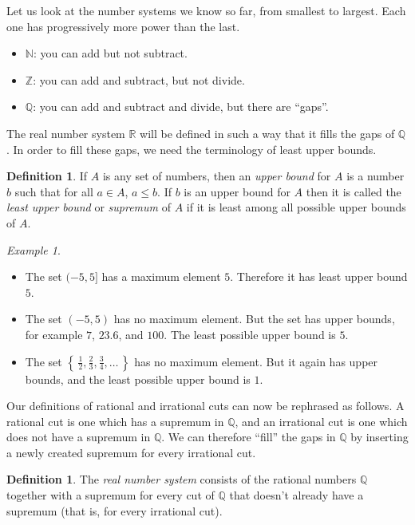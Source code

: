 \documentclass[11pt,oneside]{amsbook}
\newcommand{\set}[1]{\left\{\,#1\,\right\}}
\newcommand{\NN}{\mathbb N}
\newcommand{\ZZ}{\mathbb Z}
\newcommand{\QQ}{\mathbb Q}
\newcommand{\RR}{\mathbb R}
\theoremstyle{definition}
\theoremstyle{plain}
\theoremstyle{definition}
\newtheorem{defn}[thm]{Definition}
\theoremstyle{remark}
\newtheorem{example}[thm]{Example}
\numberwithin{equation}{section}
\numberwithin{figure}{section}
\begin{document}
Let us look at the number systems we know so far, from smallest to largest. Each one has progressively more power than the last.
\begin{itemize}
\item $\NN$: you can add but not subtract.
\item $\ZZ$: you can add and subtract, but not divide.
\item $\QQ$: you can add and subtract and divide, but there are ``gaps''.
\end{itemize}

The real number system $\RR$ will be defined in such a way that it fills the gaps of $\QQ$. In order to fill these gaps, we need the terminology of least upper bounds.

\begin{defn}
  If $A$ is any set of numbers, then an \emph{upper bound} for $A$ is a number $b$ such that for all $a\in A$, $a\leq b$. If $b$ is an upper bound for $A$ then it is called the \emph{least upper bound} or \emph{supremum} of $A$ if it is least among all possible upper bounds of $A$.
\end{defn}

\begin{example}
  \begin{itemize}
  \item The set $(-5,5]$ has a maximum element $5$. Therefore it has least upper bound $5$.
  \item The set $(-5,5)$ has no maximum element. But the set has upper bounds, for example $7$, $23.6$, and $100$. The least possible upper bound is $5$.
  \item The set $\set{\frac12,\frac23,\frac34,\ldots}$ has no maximum element. But it again has upper bounds, and the least possible upper bound is $1$.
  \end{itemize}
\end{example}

Our definitions of rational and irrational cuts can now be rephrased as follows. A rational cut is one which has a supremum in $\QQ$, and an irrational cut is one which does not have a supremum in $\QQ$. We can therefore ``fill'' the gaps in $\QQ$ by inserting a newly created supremum for every irrational cut.

\begin{defn}
  The \emph{real number system} consists of the rational numbers $\QQ$ together with a supremum for every cut of $\QQ$ that doesn't already have a supremum (that is, for every irrational cut).
\end{defn}
\end{document}
